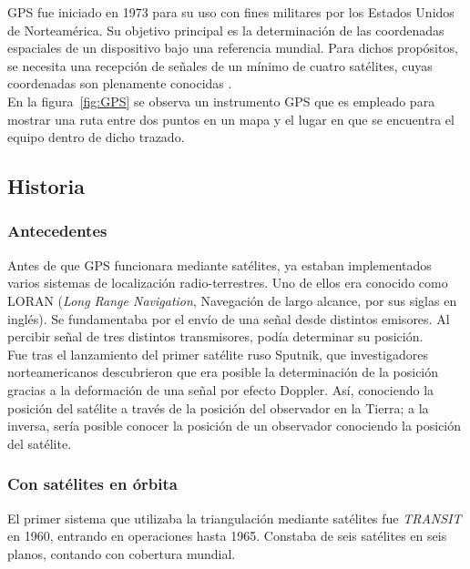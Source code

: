 
GPS fue iniciado en 1973 para su uso con fines militares por los Estados Unidos de Norteamérica. Su objetivo principal es la determinación de las coordenadas espaciales de un dispositivo bajo una referencia mundial. Para dichos propósitos, se necesita una recepción de señales de un mínimo de cuatro satélites, cuyas coordenadas son plenamente conocidas \citep{huerta2005gps}.\\

En la figura~\ref{fig:GPS} se observa un instrumento GPS que es empleado para mostrar una ruta entre dos puntos en un mapa y el lugar en que se encuentra el equipo dentro de dicho trazado.

\subsection{Historia}

\subsubsection{Antecedentes}
Antes de que GPS funcionara mediante satélites, ya estaban implementados varios sistemas de localización radio-terrestres. Uno de ellos era conocido como LORAN (\textit{Long Range Navigation}, Navegación de largo alcance, por sus siglas en inglés). Se fundamentaba por el envío de una señal desde distintos emisores. Al percibir señal de tres distintos transmisores, podía determinar su posición. \\

Fue tras el lanzamiento del primer satélite ruso Sputnik, que investigadores norteamericanos descubrieron que era posible la determinación de la posición gracias a la deformación de una señal por efecto Doppler. Así, conociendo la posición del satélite a través de la posición del observador en la Tierra; a la inversa, sería posible conocer la posición de un observador conociendo la posición del satélite.

\subsubsection{Con satélites en órbita}
El primer sistema que utilizaba la triangulación mediante satélites fue \textit{TRANSIT} en 1960, entrando en operaciones hasta 1965. Constaba de seis satélites en seis planos, contando con cobertura mundial. \\

